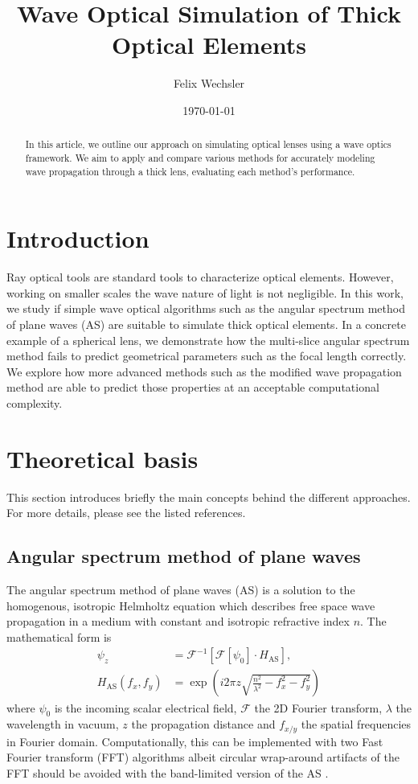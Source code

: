 \documentclass[a4paper,12pt]{article}
\title{Wave Optical Simulation of Thick Optical Elements}
\author{Felix Wechsler}
\date{\today}
\begin{document}
\maketitle
\thispagestyle{empty}

\begin{abstract}
In this article, we outline our approach on simulating optical lenses using a wave optics framework. 
We aim to apply and compare various methods for accurately modeling wave propagation through a thick lens, evaluating each method's performance.
\end{abstract}


\section{Introduction}
Ray optical tools are standard tools to characterize optical elements. However, working on smaller scales the wave nature of light is not negligible.
In this work, we study if simple wave optical algorithms such as the angular spectrum method of plane waves (AS) are suitable to
simulate thick optical elements.
In a concrete example of a spherical lens, we demonstrate how the multi-slice angular spectrum method fails to predict geometrical parameters such as the focal length correctly.
We explore how more advanced methods such as the modified wave propagation method \cite{schmidt2016wave} are able to predict those properties at an 
acceptable computational complexity. 


\section{Theoretical basis}
This section introduces briefly the main concepts behind the different approaches.
For more details, please see the listed references.
\subsection{Angular spectrum method of plane waves}
The angular spectrum method of plane waves (AS) is a solution to the homogenous, isotropic Helmholtz equation which describes free space wave propagation
in a medium with constant and isotropic refractive index $n$.
The mathematical form is
\begin{align}
\psi_{z}&=\mathcal{F}^{-1}\left[\mathcal{F}\left[\psi_{0}\right] \cdot H_{\textrm{AS}}\right],\\
H_{\textrm{AS}}\left(f_{x},f_{y}\right)&=\exp\left(i2\pi z\sqrt{\frac{n^2}{\lambda^{2}}-f_{x}^{2}-f_{y}^{2}}\right)
\end{align}
where $\psi_0$ is the incoming scalar electrical field, $\mathcal{F}$ the 2D Fourier transform, $\lambda$ the wavelength in vacuum, $z$ the propagation distance and $f_{x/y}$ the spatial frequencies in Fourier domain.
Computationally, this can be implemented with two Fast Fourier transform (FFT) algorithms albeit circular wrap-around artifacts of the FFT should be avoided
with the band-limited version of the AS \cite{matsushima2009band}.
\end{document}
